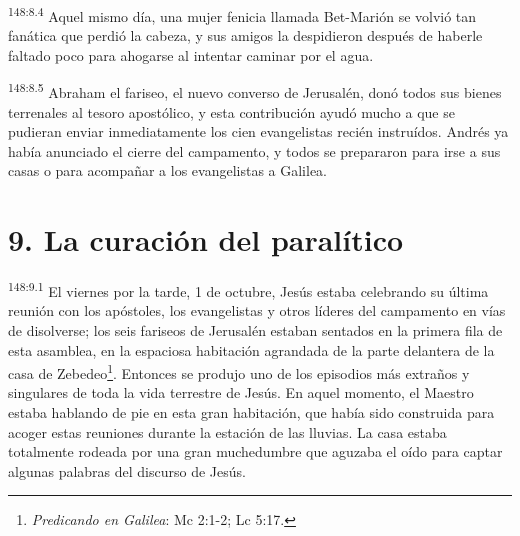 \par
\textsuperscript{148:8.4} Aquel mismo día, una mujer fenicia llamada Bet-Marión se volvió tan fanática que perdió la cabeza, y sus amigos la despidieron después de haberle faltado poco para ahogarse al intentar caminar por el agua.

\par
\textsuperscript{148:8.5} Abraham el fariseo, el nuevo converso de Jerusalén, donó todos sus bienes terrenales al tesoro apostólico, y esta contribución ayudó mucho a que se pudieran enviar inmediatamente los cien evangelistas recién instruídos. Andrés ya había anunciado el cierre del campamento, y todos se prepararon para irse a sus casas o para acompañar a los evangelistas a Galilea.

\section*{9. La curación del paralítico}
\par
\textsuperscript{148:9.1} El viernes por la tarde, 1 de octubre, Jesús estaba celebrando su última reunión con los apóstoles, los evangelistas y otros líderes del campamento en vías de disolverse; los seis fariseos de Jerusalén estaban sentados en la primera fila de esta asamblea, en la espaciosa habitación agrandada de la parte delantera de la casa de Zebedeo\footnote{\textit{Predicando en Galilea}: Mc 2:1-2; Lc 5:17.}. Entonces se produjo uno de los episodios más extraños y singulares de toda la vida terrestre de Jesús. En aquel momento, el Maestro estaba hablando de pie en esta gran habitación, que había sido construida para acoger estas reuniones durante la estación de las lluvias. La casa estaba totalmente rodeada por una gran muchedumbre que aguzaba el oído para captar algunas palabras del discurso de Jesús.

